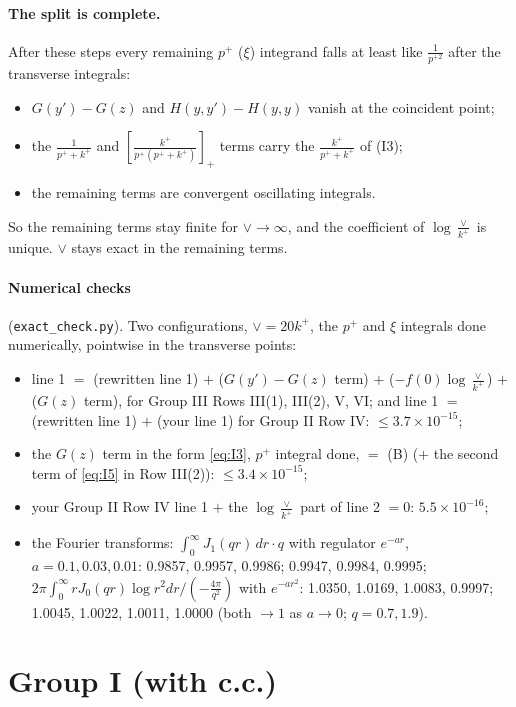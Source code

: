 \documentclass[10pt]{article}
\numberwithin{equation}{section}
\begin{document}
\paragraph{The split is complete.} After these steps every remaining $p^+$ ($\xi$) integrand falls at least like $\frac{1}{p^{+2}}$ after the transverse integrals:
\begin{itemize}
\item $G(y')-G(z)$ and $H(y,y')-H(y,y)$ vanish at the coincident point;
\item the $\frac{1}{p^++k^+}$ and $\left[\frac{k^+}{p^+(p^++k^+)}\right]_+$ terms carry the $\frac{k^+}{p^++k^+}$ of (I3);
\item the remaining terms are convergent oscillating integrals.
\end{itemize}
So the remaining terms stay finite for $\vee\to\infty$, and the coefficient of $\log\frac{\vee}{k^+}$ is unique. $\vee$ stays exact in the remaining terms.

\paragraph{Numerical checks} (\texttt{exact\_check.py}). Two configurations, $\vee=20k^+$, the $p^+$ and $\xi$ integrals done numerically, pointwise in the transverse points:
\begin{itemize}
\item line 1 $=$ (rewritten line 1) $+$ ($G(y')-G(z)$ term) $+$ ($-f(0)\log\frac{\vee}{k^+}$) $+$ ($G(z)$ term), for Group III Rows III(1), III(2), V, VI; and line 1 $=$ (rewritten line 1) $+$ (your line 1) for Group II Row IV: $\le3.7\times10^{-15}$;
\item the $G(z)$ term in the form \eqref{eq:I3}, $p^+$ integral done, $=$ (B) ($+$ the second term of \eqref{eq:I5} in Row III(2)): $\le3.4\times10^{-15}$;
\item your Group II Row IV line 1 $+$ the $\log\frac{\vee}{k^+}$ part of line 2 $=0$: $5.5\times10^{-16}$;
\item the Fourier transforms: $\int_0^\infty J_1(qr)\,dr\cdot q$ with regulator $e^{-ar}$, $a=0.1,0.03,0.01$: 0.9857, 0.9957, 0.9986; 0.9947, 0.9984, 0.9995; $2\pi\int_0^\infty rJ_0(qr)\log r^2dr\big/(-\frac{4\pi}{q^2})$ with $e^{-ar^2}$: 1.0350, 1.0169, 1.0083, 0.9997; 1.0045, 1.0022, 1.0011, 1.0000 (both $\to1$ as $a\to0$; $q=0.7,1.9$).
\end{itemize}

\section{Group I (with c.c.)}\label{sec:BgI}
\end{document}
